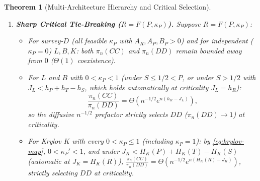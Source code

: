 \documentclass[11pt,reqno]{amsart}
\newtheorem{theorem}{Theorem}[section]
\theoremstyle{definition}
\theoremstyle{remark}
\begin{document}
\begin{theorem}[Multi-Architecture Hierarchy and Critical Selection]
\begin{enumerate}
  \item \textbf{Sharp Critical Tie-Breaking ($R = F(P,\kappa_P)$).} Suppose $R = F(P,\kappa_P)$:
  \begin{itemize}
    \item For survey-$D$ (all feasible $\kappa_P$ with $A_R,A_P,B_P>0$) and for independent ($\kappa_P = 0$) $L, B, K$: both $\pi_n(CC)$ and $\pi_n(DD)$ remain bounded away from $0$ ($\Theta(1)$ coexistence).
    \item For $L$ and $B$ with $0 < \kappa_P < 1$ (under $S \le 1/2 < P$, or under $S > 1/2$ with $J_L < h_P + h_T - h_S$, which holds automatically at criticality $J_L = h_R$):
    \begin{equation}\label{eq:critical-n-half}
      \frac{\pi_n(CC)}{\pi_n(DD)} = \Theta\!\left(n^{-1/2} e^{n(h_R - J_L)}\right),
    \end{equation}
    so the diffusive $n^{-1/2}$ prefactor strictly selects $DD$ ($\pi_n(DD) \to 1$) at criticality.
    \item For Krylov $K$ with \emph{every} $0 < \kappa_P \le 1$ (including $\kappa_P = 1$): by \eqref{eq:krylov-map}, $0 < \kappa_P' < 1$, and under $J_K < H_K(P) + H_K(T) - H_K(S)$ (automatic at $J_K = H_K(R)$), $\frac{\pi_n(CC)}{\pi_n(DD)} = \Theta(n^{-1/2} e^{n(H_K(R)-J_K)})$, strictly selecting $DD$ at criticality.
  \end{itemize}
\end{enumerate}
\end{theorem}
\end{document}
